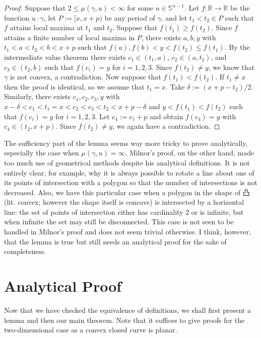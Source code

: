 \documentclass{amsart}
\theoremstyle{definition}
\theoremstyle{remark}
\begin{document}
\begin{proof}
    Suppose that $2\le\mu(\gamma,u)<\infty$
    for some $u\in\mathbb{S}^{n-1}$.
    Let $f:\mathbb{R}\to\mathbb{R}$ be the function $u\cdot\gamma$,
    let $P:=[x,x+p)$ be any period of $\gamma$, and let $t_1<t_2\in P$
    such that $f$ attains local maxima at $t_1$ and $t_2$.
    Suppose that $f(t_1)\ge f(t_2)$.
    Since $f$ attains a finite number of local maxima in $P$,
    there exists $a,b,y$ with $t_1<a<t_2<b<x+p$ such that
    $f(a),f(b)<y<f(t_2)\le f(t_1)$.
    By the intermediate value theorem there exists
    $c_1\in(t_1,a)$, $c_2\in(a,t_2)$, and $c_3\in(t_2,b)$ such that
    $f(c_i)=y$ for $i=1,2,3$. Since $f(t_2)\ne y$, we know that
    $\gamma$ is not convex, a contradiction.
    Now suppose that $f(t_1)<f(t_2)$.
    If $t_1\ne x$ then the proof is identical,
    so we assume that $t_1=x$. Take $\delta:=(x+p-t_2)/2$.
    Similarly, there exists $c_1,c_2,c_3,y$ with
    $x-\delta<c_1<t_1=x<c_2<c_3<t_2<x+p-\delta$
    and $y<f(t_1)<f(t_2)$ such that
    $f(c_i)=y$ for $i=1,2,3$.
    Let $c_4:=c_1+p$ and obtain $f(c_4)=y$ with $c_4\in(t_2,x+p)$.
    Since $f(t_2)\ne y$, we again have a contradiction.
\end{proof}

The sufficiency part of the lemma seems way more tricky to prove
analytically, especially the case when $\mu(\gamma,u)=\infty$.
Milnor's proof, on the other hand, made too much use of
geometrical methods despite his analytical definitions.
It is not entirely clear, for example, why it is always possible
to rotate a line about one of its points of intersection with
a polygon so that the number of intersections is not decreased.
Also, we have this particular case when a polygon in the shape of 凸
(lit. convex; however the shape itself is concave)
is intersected by a horizontal line: the set of points of intersection
either has cardinality 2 or is infinite, but when infinite
the set may still be disconnected. This case is not seen to
be handled in Milnor's proof and does not seem trivial otherwise.
I think, however, that the lemma is true but still needs
an analytical proof for the sake of completeness.

\section{Analytical Proof}

Now that we have checked the equivalence of definitions,
we shall first present a lemma and then our main theorem.
Note that it suffices to give proofs for the two-dimensional case
as a convex closed curve is planar.
\end{document}
